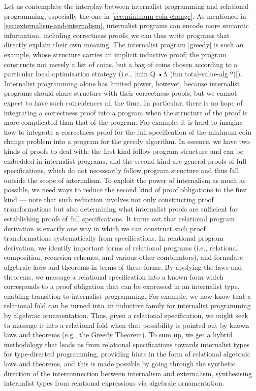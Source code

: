 Let us contemplate the interplay between internalist programming and relational programming, especially the one in \autoref{sec:minimum-coin-change}.
As mentioned in \autoref{sec:externalism-and-internalism}, internalist programs can encode more semantic information, including correctness proofs; we can thus write programs that directly explain their own meaning.
The internalist program |greedy| is such an example, whose structure carries an implicit inductive proof; the program constructs not merely a list of coins, but a bag of coins chosen according to a particular local optimisation strategy (i.e., |min Q •Λ (fun total-value-alg º)|).
Internalist programming alone has limited power, however, because internalist programs should share structure with their correctness proofs, but we cannot expect to have such coincidences all the time.
In particular, there is no hope of integrating a correctness proof into a program when the structure of the proof is more complicated than that of the program.
For example, it is hard to imagine how to integrate a correctness proof for the full specification of the minimum coin change problem into a program for the greedy algorithm.
In essence, we have two kinds of proofs to deal with: the first kind follow program structure and can be embedded in internalist programs, and the second kind are general proofs of full specifications, which do not necessarily follow program structure and thus fall outside the scope of internalism.
To exploit the power of internalism as much as possible, we need ways to reduce the second kind of proof obligations to the first kind --- note that such reduction involves not only constructing proof transformations but also determining what internalist proofs are sufficient for establishing proofs of full specifications.
It turns out that relational program derivation is exactly one way in which we can construct such proof transformations systematically from specifications.
In relational program derivation, we identify important forms of relational programs (i.e., relational composition, recursion schemes, and various other combinators), and formulate algebraic laws and theorems in terms of these forms.
By applying the laws and theorems, we massage a relational specification into a known form which corresponds to a proof obligation that can be expressed in an internalist type, enabling transition to internalist programming.
For example, we now know that a relational fold can be turned into an inductive family for internalist programming by algebraic ornamentation.
Thus, given a relational specification, we might seek to massage it into a relational fold when that possibility is pointed out by known laws and theorems (e.g., the Greedy Theorem).
To sum up, we get a hybrid methodology that leads us from relational specifications towards internalist types for type-directed programming, providing hints in the form of relational algebraic laws and theorems, and this is made possible by going through the synthetic direction of the interconnection between internalism and externalism, synthesising internalist types from relational expressions via algebraic ornamentation.